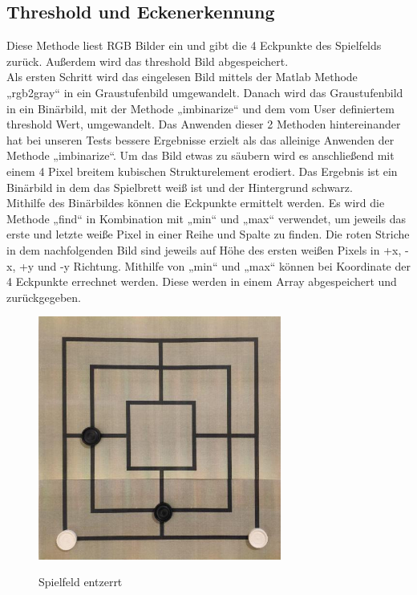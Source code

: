 \documentclass[paper=A4, deutsch]{scrartcl}
\begin{document}
\subsection{Threshold und Eckenerkennung}
Diese Methode liest RGB Bilder ein und gibt die 4 Eckpunkte des Spielfelds zurück. Außerdem wird das threshold Bild abgespeichert.\\
Als ersten Schritt wird das eingelesen Bild mittels der Matlab Methode „rgb2gray“ in ein Graustufenbild umgewandelt. Danach wird das Graustufenbild in ein Binärbild, mit der Methode „imbinarize“ und dem vom User definiertem threshold Wert, umgewandelt. Das Anwenden dieser 2 Methoden hintereinander hat bei unseren Tests bessere Ergebnisse erzielt als das alleinige Anwenden der Methode „imbinarize“. Um das Bild etwas zu säubern wird es anschließend mit einem  4 Pixel breitem kubischen Strukturelement erodiert. Das Ergebnis ist ein Binärbild in dem das Spielbrett weiß ist und der Hintergrund schwarz.\\
Mithilfe des Binärbildes können die Eckpunkte ermittelt werden. Es wird die Methode „find“ in Kombination mit „min“ und „max“ verwendet, um jeweils das erste und letzte weiße Pixel in einer Reihe und Spalte zu finden. Die roten Striche in dem nachfolgenden Bild sind jeweils auf Höhe des ersten weißen Pixels in +x, -x, +y und -y Richtung. Mithilfe von „min“ und „max“ können bei Koordinate der 4 Eckpunkte errechnet werden. Diese werden in einem Array abgespeichert und zurückgegeben.\\

\begin{figure}[ht]
	\centering
		\includegraphics[width=8cm]{Spielbrett_Entzerrt.png}\\
	\caption[Spielfeld entzerrt]{Spielfeld entzerrt}
	\label{fig:nettop}
\end{figure}
\end{document}
